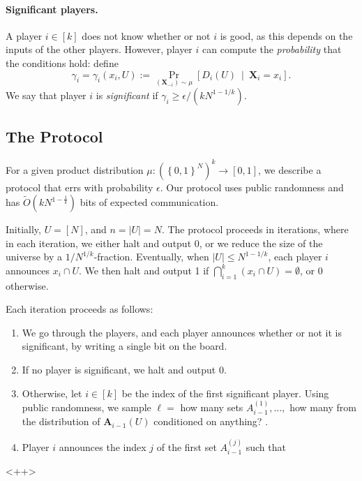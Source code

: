 \documentclass{article}
\newcommand{\set}[1]{\left\{#1\right\}}
\newcommand{\coloneq}{:=}
\newcommand{\eps}{\epsilon}
\newcommand{\TODO}[1]{ {\color{red} #1 }}
\newcommand{\given}{\medspace \middle| \medspace}
\newcommand{\rv}[1]{\mathbf{#1}}
\theoremstyle{plain}
\begin{document}
\paragraph{Significant players.}
A player $i \in [k]$ does not know whether or not $i$ is good,
as this depends on the inputs of the other players.
However, player $i$ can compute the \emph{probability} that the conditions hold:
define
\begin{equation*}
  \gamma_i = \gamma_i(x_i, U) \coloneq \Pr_{(\rv{X}_{-i}) \sim \mu}\left[ D_i(U) \given \rv{X}_i = x_i \right].
\end{equation*}
We say that player $i$ is \emph{significant} if $\gamma_i \geq \eps / (kN^{1-1/k})$.

\subsection{The Protocol}

For a given product distribution $\mu : \left(\set{0,1}^N\right)^k \rightarrow [0,1]$, we describe a protocol that errs with probability $\epsilon$.
Our protocol uses public randomness and has $\tilde{O}(kN^{1-\frac{1}{k}})$ bits of expected communication.

Initially, $U = [N]$, and $n = |U| = N$.
The protocol proceeds in iterations, where in each iteration, we either halt and output 0,
or we reduce the size of the universe by a $1/N^{1/k}$-fraction.
Eventually, when $|U| \leq N^{1-1/k}$, each player $i$ announces $x_i \cap U$.
We then halt and output 1 if $\bigcap_{i = 1}^k (x_i \cap U) = \emptyset$, or 0 otherwise.

Each iteration proceeds as follows:
\begin{enumerate}[(1)]
  \item We go through the players, and each player announces whether or not it is significant, by writing a single bit on the board.
  \item If no player is significant, we halt and output 0.
  \item Otherwise, let $i \in [k]$ be the index of the first significant player. Using public randomness,
    we sample $\ell = $ \TODO{how many} sets $A_{i-1}^{(1)},\ldots,$\TODO{how many}
    from the distribution of $\rv{A}_{i-1}(U)$ \TODO{conditioned on anything?}.
  \item Player $i$ announces the index $j$ of the first set $A_{i-1}^{(j)}$ such that 

\end{enumerate}<++>
\end{document}

